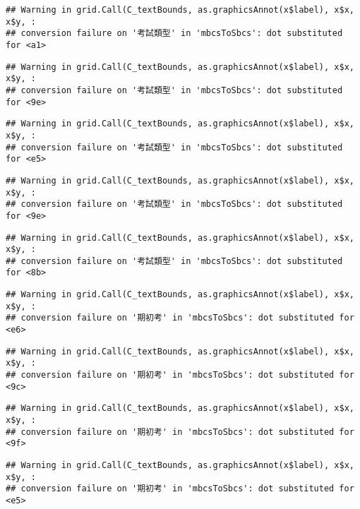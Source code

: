 \documentclass[
]{book}
\begin{document}
\begin{verbatim}
## Warning in grid.Call(C_textBounds, as.graphicsAnnot(x$label), x$x, x$y, :
## conversion failure on '考試類型' in 'mbcsToSbcs': dot substituted for <a1>
\end{verbatim}

\begin{verbatim}
## Warning in grid.Call(C_textBounds, as.graphicsAnnot(x$label), x$x, x$y, :
## conversion failure on '考試類型' in 'mbcsToSbcs': dot substituted for <9e>
\end{verbatim}

\begin{verbatim}
## Warning in grid.Call(C_textBounds, as.graphicsAnnot(x$label), x$x, x$y, :
## conversion failure on '考試類型' in 'mbcsToSbcs': dot substituted for <e5>
\end{verbatim}

\begin{verbatim}
## Warning in grid.Call(C_textBounds, as.graphicsAnnot(x$label), x$x, x$y, :
## conversion failure on '考試類型' in 'mbcsToSbcs': dot substituted for <9e>
\end{verbatim}

\begin{verbatim}
## Warning in grid.Call(C_textBounds, as.graphicsAnnot(x$label), x$x, x$y, :
## conversion failure on '考試類型' in 'mbcsToSbcs': dot substituted for <8b>
\end{verbatim}

\begin{verbatim}
## Warning in grid.Call(C_textBounds, as.graphicsAnnot(x$label), x$x, x$y, :
## conversion failure on '期初考' in 'mbcsToSbcs': dot substituted for <e6>
\end{verbatim}

\begin{verbatim}
## Warning in grid.Call(C_textBounds, as.graphicsAnnot(x$label), x$x, x$y, :
## conversion failure on '期初考' in 'mbcsToSbcs': dot substituted for <9c>
\end{verbatim}

\begin{verbatim}
## Warning in grid.Call(C_textBounds, as.graphicsAnnot(x$label), x$x, x$y, :
## conversion failure on '期初考' in 'mbcsToSbcs': dot substituted for <9f>
\end{verbatim}

\begin{verbatim}
## Warning in grid.Call(C_textBounds, as.graphicsAnnot(x$label), x$x, x$y, :
## conversion failure on '期初考' in 'mbcsToSbcs': dot substituted for <e5>
\end{verbatim}
\end{document}
